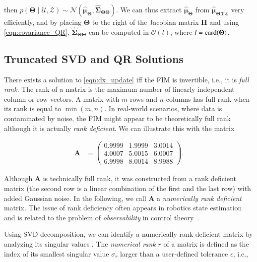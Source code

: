 \noindent then $p(\boldsymbol{\Theta}\mid\mathcal{U},\mathcal{Z})\sim\mathcal{N}
(\hat{\boldsymbol{\mu}}_{\boldsymbol{\Theta}},
\hat{\boldsymbol{\Sigma}}_{\boldsymbol{\Theta}\boldsymbol{\Theta}})$. We can
thus extract $\hat{\boldsymbol{\mu}}_{\boldsymbol{\Theta}}$ from
$\hat{\boldsymbol{\mu}}_{\boldsymbol{\Theta}\mathcal{X}\mathcal{L}}$ very
efficiently, and by placing $\boldsymbol{\Theta}$ to the right of the Jacobian
matrix $\mathbf{H}$ and using \eqref{eqn:covariance_QR},
$\hat{\boldsymbol{\Sigma}}_{\boldsymbol{\Theta}\boldsymbol{\Theta}}$ can be
computed in $\mathcal{O}(l)$, where $l=\operatorname{card}(\boldsymbol{\Theta})$.

\subsection{Truncated SVD and QR Solutions}

There exists a solution to \eqref{eqn:dx_update}
iff the FIM is invertible, i.e., it is \emph{full rank}. The rank of a
matrix is the maximum number of linearly independent column or row vectors. A
matrix with $m$ rows and $n$ columns has full rank when its rank is equal to
$\min(m,n)$. In real-world scenarios, where data is contaminated by noise, the
FIM might appear to be theoretically full rank although it is actually
\emph{rank deficient}. We can illustrate this with the matrix

\begin{equation}\label{eqn:rank_deficient_matrix}
  \begin{aligned}
    \mathbf{A} &=
    \begin{pmatrix}
    0.9999&1.9999&3.0014\\
    4.0007&5.0015&6.0007\\
    6.9998&8.0014&8.9988
    \end{pmatrix}.
  \end{aligned}
\end{equation}

Although $\mathbf{A}$ is technically full rank, it was constructed from a rank
deficient matrix (the second row is a linear combination of the first and the
last row) with added Gaussian noise. In the following, we call $\mathbf{A}$
a \emph{numerically rank deficient} matrix. The issue of rank deficiency often
appears in robotics state estimation and is related to the problem of
\emph{observability} in control theory~\cite{jauffret07observability}.

Using SVD decomposition, we can identify a numerically rank deficient matrix by
analyzing its singular values \cite{hansen1998rank}. The \emph{numerical rank}
$r$ of a matrix is defined as the index of its smallest singular value
$\sigma_r$ larger than a user-defined tolerance $\epsilon$, i.e.,

